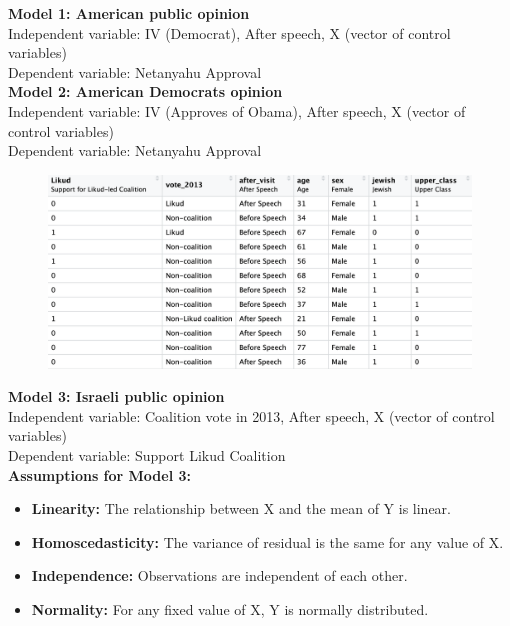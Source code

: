 \documentclass[12pt,letterpaper]{article}
\begin{document}
\textbf{Model 1: American public opinion }\\
Independent variable: IV (Democrat), After speech, X (vector of control variables)  \\
Dependent variable: Netanyahu Approval \\

\textbf{Model 2: American Democrats opinion}\\
Independent variable: IV (Approves of Obama), After speech, X (vector of control variables) \\
Dependent variable: Netanyahu Approval  \\

	 
	
		\begin{figure}[H]
		\centering
		\includegraphics[width=1.0\textwidth]{Images/Image2.png}
		\label{fig:your_figure_label} 
	\end{figure}

\textbf{Model 3: Israeli public opinion}\\
Independent variable: Coalition vote in 2013, After speech, X (vector of control variables)  \\
Dependent variable: Support Likud Coalition\\

\textbf{Assumptions for Model 3:}
\begin{itemize}
	\item \textbf{Linearity:} The relationship between X and the mean of Y is linear.
	\item \textbf{Homoscedasticity:} The variance of residual is the same for any value of X.
	\item \textbf{Independence:} Observations are independent of each other.
	\item \textbf{Normality:} For any fixed value of X, Y is normally distributed.
\end{itemize}
	
\end{document}
